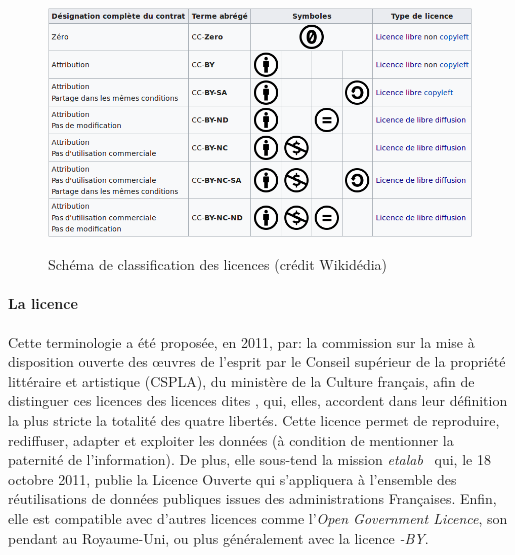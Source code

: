 \begin{figure}[!h]
\begin{minipage}{0.95\linewidth}
                \centering
                \includegraphics[width=\linewidth]{Figures/wiki-licenceCC}
                \label{fig:tab_licence_CC}
            \end{minipage}
            \caption[Classification des licences]{Schéma de classification des licences (crédit Wikidédia)}\label{fig:class_licence}
        \end{figure}
        \paragraph{La licence }
            Cette terminologie a été proposée, en 2011, par: la commission sur la mise à disposition ouverte des œuvres de l'esprit par le Conseil supérieur de la propriété littéraire et artistique (CSPLA), du ministère de la Culture français, afin de distinguer ces licences des licences dites , qui, elles, accordent dans leur définition la plus stricte la totalité des quatre libertés. Cette licence permet de reproduire, rediffuser, adapter et exploiter les données (à condition de mentionner la paternité de l'information). De plus, elle sous-tend la mission \textit{etalab}~ qui, le 18 octobre 2011, publie la Licence Ouverte qui s'appliquera à l'ensemble des réutilisations de données publiques issues des administrations Françaises. Enfin, elle est compatible avec d'autres licences comme l'\textit{Open Government Licence}, son pendant au Royaume-Uni, ou plus généralement avec la licence \textit{-BY}.
